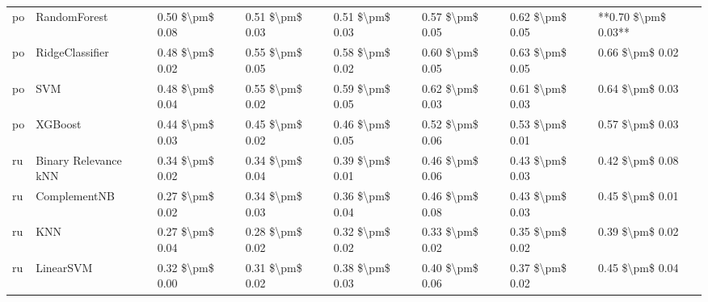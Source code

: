 \begin{tabular}{llllllll}
      po &                    RandomForest & 0.50 \$\textbackslash pm\$ 0.08 &           0.51 \$\textbackslash pm\$ 0.03 &       0.51 \$\textbackslash pm\$ 0.03 &        0.57 \$\textbackslash pm\$ 0.05 &                         0.62 \$\textbackslash pm\$ 0.05 & **0.70 \$\textbackslash pm\$ 0.03** \\
      po &                 RidgeClassifier & 0.48 \$\textbackslash pm\$ 0.02 &           0.55 \$\textbackslash pm\$ 0.05 &       0.58 \$\textbackslash pm\$ 0.02 &        0.60 \$\textbackslash pm\$ 0.05 &                         0.63 \$\textbackslash pm\$ 0.05 &     0.66 \$\textbackslash pm\$ 0.02 \\
      po &                             SVM & 0.48 \$\textbackslash pm\$ 0.04 &           0.55 \$\textbackslash pm\$ 0.02 &       0.59 \$\textbackslash pm\$ 0.05 &        0.62 \$\textbackslash pm\$ 0.03 &                         0.61 \$\textbackslash pm\$ 0.03 &     0.64 \$\textbackslash pm\$ 0.03 \\
      po &                         XGBoost & 0.44 \$\textbackslash pm\$ 0.03 &           0.45 \$\textbackslash pm\$ 0.02 &       0.46 \$\textbackslash pm\$ 0.05 &        0.52 \$\textbackslash pm\$ 0.06 &                         0.53 \$\textbackslash pm\$ 0.01 &     0.57 \$\textbackslash pm\$ 0.03 \\
      ru &            Binary Relevance kNN & 0.34 \$\textbackslash pm\$ 0.02 &           0.34 \$\textbackslash pm\$ 0.04 &       0.39 \$\textbackslash pm\$ 0.01 &        0.46 \$\textbackslash pm\$ 0.06 &                         0.43 \$\textbackslash pm\$ 0.03 &     0.42 \$\textbackslash pm\$ 0.08 \\
      ru &                    ComplementNB & 0.27 \$\textbackslash pm\$ 0.02 &           0.34 \$\textbackslash pm\$ 0.03 &       0.36 \$\textbackslash pm\$ 0.04 &        0.46 \$\textbackslash pm\$ 0.08 &                         0.43 \$\textbackslash pm\$ 0.03 &     0.45 \$\textbackslash pm\$ 0.01 \\
      ru &                             KNN & 0.27 \$\textbackslash pm\$ 0.04 &           0.28 \$\textbackslash pm\$ 0.02 &       0.32 \$\textbackslash pm\$ 0.02 &        0.33 \$\textbackslash pm\$ 0.02 &                         0.35 \$\textbackslash pm\$ 0.02 &     0.39 \$\textbackslash pm\$ 0.02 \\
      ru &                       LinearSVM & 0.32 \$\textbackslash pm\$ 0.00 &           0.31 \$\textbackslash pm\$ 0.02 &       0.38 \$\textbackslash pm\$ 0.03 &        0.40 \$\textbackslash pm\$ 0.06 &                         0.37 \$\textbackslash pm\$ 0.02 &     0.45 \$\textbackslash pm\$ 0.04 \\

\end{tabular}
